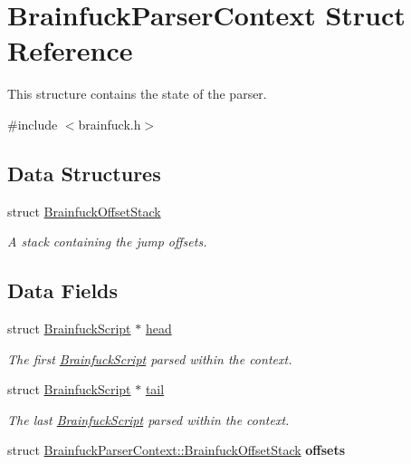 \hypertarget{structBrainfuckParserContext}{}\section{Brainfuck\+Parser\+Context Struct Reference}
\label{structBrainfuckParserContext}


This structure contains the state of the parser.  




{\ttfamily \#include $<$brainfuck.\+h$>$}

\subsection*{Data Structures}
\begin{DoxyCompactItemize}
\item 
struct \hyperlink{structBrainfuckParserContext_1_1BrainfuckOffsetStack}{Brainfuck\+Offset\+Stack}
\begin{DoxyCompactList}\small\item\em A stack containing the jump offsets. \end{DoxyCompactList}\end{DoxyCompactItemize}
\subsection*{Data Fields}
\begin{DoxyCompactItemize}
\item 
\hypertarget{structBrainfuckParserContext_a0108dd71ddc1ca32b4668432e6090e5c}{}struct \hyperlink{structBrainfuckScript}{Brainfuck\+Script} $\ast$ \hyperlink{structBrainfuckParserContext_a0108dd71ddc1ca32b4668432e6090e5c}{head}\label{structBrainfuckParserContext_a0108dd71ddc1ca32b4668432e6090e5c}

\begin{DoxyCompactList}\small\item\em The first \hyperlink{structBrainfuckScript}{Brainfuck\+Script} parsed within the context. \end{DoxyCompactList}\item 
\hypertarget{structBrainfuckParserContext_adf600a9fd16a2a9b6c6ff542f86f0f54}{}struct \hyperlink{structBrainfuckScript}{Brainfuck\+Script} $\ast$ \hyperlink{structBrainfuckParserContext_adf600a9fd16a2a9b6c6ff542f86f0f54}{tail}\label{structBrainfuckParserContext_adf600a9fd16a2a9b6c6ff542f86f0f54}

\begin{DoxyCompactList}\small\item\em The last \hyperlink{structBrainfuckScript}{Brainfuck\+Script} parsed within the context. \end{DoxyCompactList}\item 
\hypertarget{structBrainfuckParserContext_af1d597063e204cae166b23df1b8e052f}{}struct \hyperlink{structBrainfuckParserContext_1_1BrainfuckOffsetStack}{Brainfuck\+Parser\+Context\+::\+Brainfuck\+Offset\+Stack} {\bfseries offsets}\label{structBrainfuckParserContext_af1d597063e204cae166b23df1b8e052f}

\end{DoxyCompactItemize}


